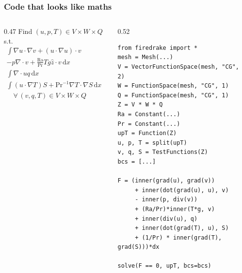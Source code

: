 \documentclass[presentation]{beamer}
\begin{document}
\begin{frame}[fragile]
  \frametitle{Code that looks like maths}
  \begin{columns}
    \begin{column}{0.47\framewidth}
      {\footnotesize
        Find $(u, p, T) \in V\times W\times Q$ s.t.
        \begin{align*}
          \int\!\nabla u \cdot \nabla v + (u \cdot \nabla u) \cdot v \\
          - p\nabla\cdot v + \frac{\text{Ra}}{\text{Pr}} Tg \hat{z} \cdot v\,\text{d}x &= 0 \\
          \int\!\nabla\cdot u q\,\text{d}x&= 0\\
          \int\! (u\cdot \nabla T) S + \text{Pr}^{-1} \nabla T \cdot \nabla
          S\,\text{d}x &= 0\\
          \quad \forall\, (v,q,T) \in V\times W \times Q
        \end{align*}
        }
    \end{column}
      \begin{column}{0.52\framewidth}
\begin{verbatim}
from firedrake import *
mesh = Mesh(...)
V = VectorFunctionSpace(mesh, "CG", 2)
W = FunctionSpace(mesh, "CG", 1)
Q = FunctionSpace(mesh, "CG", 1)
Z = V * W * Q
Ra = Constant(...)
Pr = Constant(...)
upT = Function(Z)
u, p, T = split(upT)
v, q, S = TestFunctions(Z)
bcs = [...]

F = (inner(grad(u), grad(v))
     + inner(dot(grad(u), u), v)
     - inner(p, div(v))
     + (Ra/Pr)*inner(T*g, v)
     + inner(div(u), q)
     + inner(dot(grad(T), u), S)
     + (1/Pr) * inner(grad(T), grad(S)))*dx

solve(F == 0, upT, bcs=bcs)
\end{verbatim}
      \end{column}
  \end{columns}
\end{frame}
\end{document}
